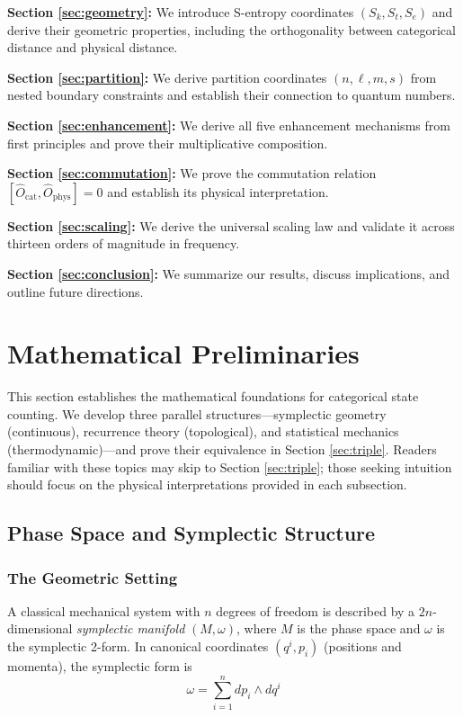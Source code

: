 \documentclass[twocolumn,10pt]{article}
\theoremstyle{remark}
\begin{document}
\textbf{Section \ref{sec:geometry}:} We introduce S-entropy coordinates $(S_k, S_t, S_e)$ and derive their geometric properties, including the orthogonality between categorical distance and physical distance.

\textbf{Section \ref{sec:partition}:} We derive partition coordinates $(n, \ell, m, s)$ from nested boundary constraints and establish their connection to quantum numbers.

\textbf{Section \ref{sec:enhancement}:} We derive all five enhancement mechanisms from first principles and prove their multiplicative composition.

\textbf{Section \ref{sec:commutation}:} We prove the commutation relation $[\hat{O}_{\text{cat}}, \hat{O}_{\text{phys}}] = 0$ and establish its physical interpretation.

\textbf{Section \ref{sec:scaling}:} We derive the universal scaling law and validate it across thirteen orders of magnitude in frequency.

\textbf{Section \ref{sec:conclusion}:} We summarize our results, discuss implications, and outline future directions.

\section{Mathematical Preliminaries}
\label{sec:preliminaries}

This section establishes the mathematical foundations for categorical state counting. We develop three parallel structures—symplectic geometry (continuous), recurrence theory (topological), and statistical mechanics (thermodynamic)—and prove their equivalence in Section \ref{sec:triple}. Readers familiar with these topics may skip to Section \ref{sec:triple}; those seeking intuition should focus on the physical interpretations provided in each subsection.

\subsection{Phase Space and Symplectic Structure}

\subsubsection{The Geometric Setting}

A classical mechanical system with $n$ degrees of freedom is described by a $2n$-dimensional \textit{symplectic manifold} $(M, \omega)$, where $M$ is the phase space and $\omega$ is the symplectic 2-form. In canonical coordinates $(q^i, p_i)$ (positions and momenta), the symplectic form is
\begin{equation}
    \omega = \sum_{i=1}^{n} dp_i \wedge dq^i
    \label{eq:symplectic_form}
\end{equation}
\end{document}
